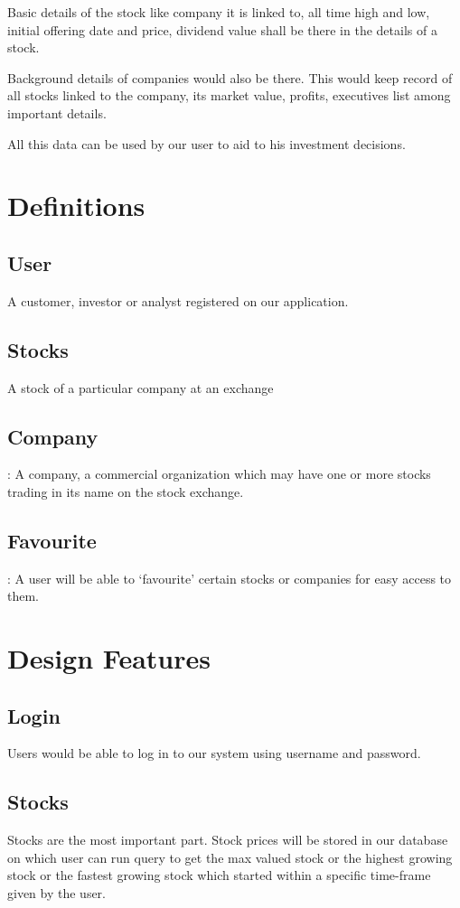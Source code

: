 \documentclass{report}
\begin{document}
Basic details of the stock like company it is linked to, all time high and low, initial offering date and price, dividend value shall be there in the details of a stock.

Background details of companies would also be there. This would keep record of all stocks linked to the company, its market value, profits, executives list among important details.

All this data can be used by our user to aid to his investment decisions.

\section{Definitions}
\subsection{User}
A customer, investor or analyst registered on our application.

\subsection{Stocks}
A stock of a particular company at an exchange

\subsection{Company} :  A company, a commercial organization which may have one or more stocks trading in its name on the stock exchange.

\subsection{Favourite} : A user will be able to ‘favourite’ certain stocks or companies for easy access to them. 

\section{Design Features}
\subsection{Login}
Users would be able to log in to our system using username and password.

\subsection{Stocks}
Stocks are the most important part. Stock prices will be stored in our database on which user can run query to get the max valued stock or the highest growing stock or the fastest growing stock which started within a specific time-frame given by the user.
\end{document}
